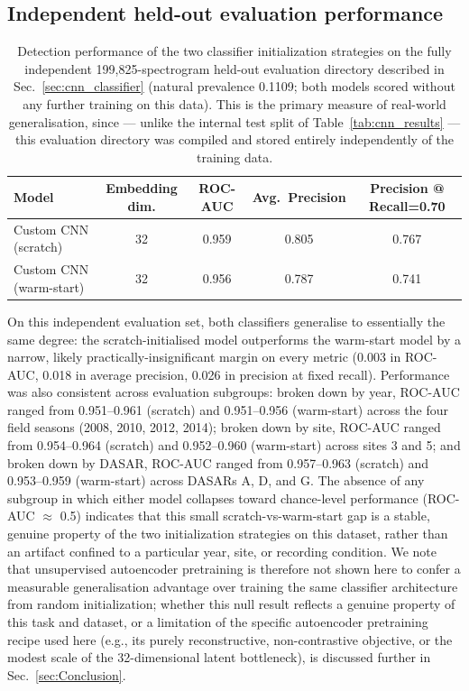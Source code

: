 \documentclass[preprint,NumberedRefs]{JASAnew}
\begin{document}
\subsection{Independent held-out evaluation performance}

\begin{table}[ht]
    \centering
    \caption{Detection performance of the two classifier initialization strategies on
    the fully independent 199,825-spectrogram held-out evaluation directory
    described in Sec.~\ref{sec:cnn_classifier} (natural prevalence 0.1109; both
    models scored without any further training on this data). This is the primary
    measure of real-world generalisation, since — unlike the internal test split of
    Table~\ref{tab:cnn_results} — this evaluation directory was compiled and stored
    entirely independently of the training data.}
    \label{tab:benchmark_results}
    \begin{tabular}{|l|c|c|c|c|}
        \hline
        Model & Embedding dim. & ROC-AUC & Avg.\ Precision & Precision @ Recall=0.70 \\
        \hline
        Custom CNN (scratch)      & 32   & 0.959 & 0.805 & 0.767 \\
        Custom CNN (warm-start)   & 32   & 0.956 & 0.787 & 0.741 \\
        \hline
    \end{tabular}
\end{table}

On this independent evaluation set, both classifiers generalise to essentially the
same degree: the scratch-initialised model outperforms the warm-start model by a
narrow, likely practically-insignificant margin on every metric (0.003 in ROC-AUC,
0.018 in average precision, 0.026 in precision at fixed recall). Performance was
also consistent across evaluation subgroups: broken down by year, ROC-AUC ranged from
0.951--0.961 (scratch) and 0.951--0.956 (warm-start) across the four field seasons
(2008, 2010, 2012, 2014); broken down by site, ROC-AUC ranged from 0.954--0.964
(scratch) and 0.952--0.960 (warm-start) across sites 3 and 5; and broken down by
DASAR, ROC-AUC ranged from 0.957--0.963 (scratch) and 0.953--0.959 (warm-start)
across DASARs A, D, and G. The absence of any subgroup in which either model
collapses toward chance-level performance (ROC-AUC $\approx$ 0.5) indicates that
this small scratch-vs-warm-start gap is a stable, genuine property of the two
initialization strategies on this dataset, rather than an artifact confined to a
particular year, site, or recording condition. We note that unsupervised
autoencoder pretraining is therefore not shown here to confer a measurable
generalisation advantage over training the same classifier architecture from
random initialization; whether this null result reflects a genuine property of
this task and dataset, or a limitation of the specific autoencoder pretraining
recipe used here (e.g., its purely reconstructive, non-contrastive objective, or
the modest scale of the 32-dimensional latent bottleneck), is discussed further
in Sec.~\ref{sec:Conclusion}.
\end{document}
